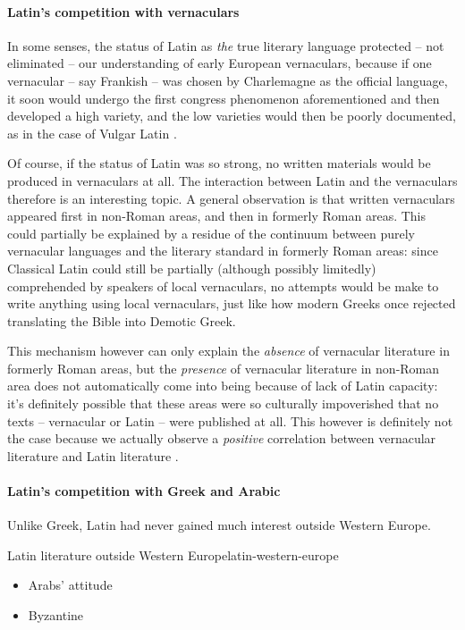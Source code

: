 \documentclass[a4paper, oneside, 12pt]{report}
\newcommand*{\citepages}[1]{pp.~{#1}}
\begin{document}
\paragraph*{Latin's competition with vernaculars}
In some senses, the status of Latin as \emph{the} true literary language
protected -- not eliminated -- our understanding of early European vernaculars,
because if one vernacular -- say Frankish -- was chosen by Charlemagne as the official language,
it soon would undergo the first congress phenomenon aforementioned
and then developed a high variety,
and the low varieties would then be poorly documented,
as in the case of Vulgar Latin
\citep[\citepages{143-144}]{leonhardt2013latin}.

Of course, if the status of Latin was so strong,
no written materials would be produced in vernaculars at all.
The interaction between Latin and the vernaculars therefore is an interesting topic.
A general observation is that written vernaculars appeared first in non-Roman areas,
and then in formerly Roman areas.
This could partially be explained by a residue of the continuum between 
purely vernacular languages and the literary standard in formerly Roman areas:
since Classical Latin could still be partially (although possibly limitedly) comprehended 
by speakers of local vernaculars,
no attempts would be make to write anything using local vernaculars,
just like how modern Greeks once rejected translating the Bible into Demotic Greek.

This mechanism however can only explain the \emph{absence} of vernacular literature in formerly Roman areas,
but the \emph{presence} of vernacular literature in non-Roman area 
does not automatically come into being because of lack of Latin capacity:
it's definitely possible that these areas were so culturally impoverished 
that no texts -- vernacular or Latin -- were published at all.
This however is definitely not the case 
because we actually observe a \emph{positive} correlation 
between vernacular literature and Latin literature
\citep[\citepages{167-168}]{leonhardt2013latin}.

\paragraph*{Latin's competition with Greek and Arabic}

Unlike Greek, Latin had never gained much interest outside Western Europe.

\begin{infobox}{Latin literature outside Western Europe}{latin-western-europe}
    \begin{itemize}
        \item Arabs' attitude 
        \item Byzantine
    \end{itemize}
\end{infobox}
\end{document}
